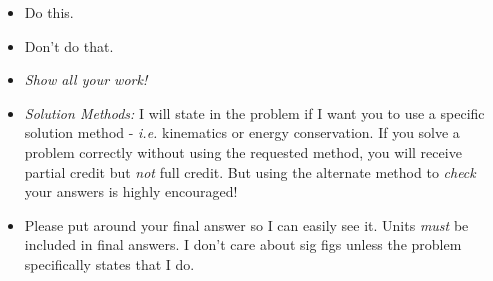 \documentclass[11pt]{exam}
\begin{document}
\begin{minipage}[t]{3.7in}
\vspace{0pt}
\begin{itemize}
\item Do this.

\item Don't do that.
  
\item \textit{Show all your work!} 



\item \textit{Solution Methods:} I will state in the problem if I want you to use a specific solution method - \textit{i.e.} kinematics or energy conservation. If you solve a problem correctly without using the requested method, you will receive partial credit but \textit{not} full credit. But using the alternate method to \textit{check} your answers is highly encouraged!

\item Please put  around your final answer so I can easily see it. Units \textit{must} be included in final answers. I don't care about sig figs unless the problem specifically states that I do.
\end{itemize}
\end{minipage}
\hfill
\begin{minipage}[t]{2.3in}
\vspace{0pt}
\addpoints %
\gradetable[v]%

\end{minipage}

\newpage %

%
%
%
\end{document}
